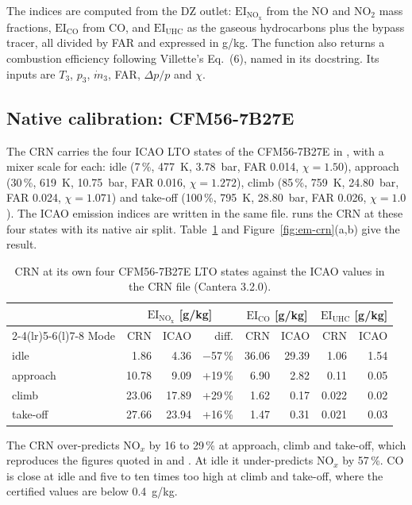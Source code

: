 \documentclass[a4paper,11pt]{article}
\newcommand{\EI}[1]{\mathrm{EI}_{\mathrm{#1}}}
\begin{document}
The indices are computed from the DZ outlet: $\EI{NO_x}$ from the NO and NO$_2$ mass fractions,
$\EI{CO}$ from CO, and $\EI{UHC}$ as the gaseous hydrocarbons plus the bypass tracer, all
divided by FAR and expressed in g/kg. The function also returns a combustion efficiency
following Villette's Eq.~(6), named in its docstring. Its inputs are $T_3$, $p_3$, $\dot m_3$,
FAR, $\Delta p/p$ and $\chi$.

\subsection{Native calibration: CFM56-7B27E}\label{sec:crn-native}
The CRN carries the four ICAO LTO states of the CFM56-7B27E in , with a mixer
scale for each: idle (7\,\%, \SI{477}{K}, \SI{3.78}{bar}, FAR 0.014, $\chi = 1.50$), approach
(30\,\%, \SI{619}{K}, \SI{10.75}{bar}, FAR 0.016, $\chi = 1.272$), climb (85\,\%, \SI{759}{K},
\SI{24.80}{bar}, FAR 0.024, $\chi = 1.071$) and take-off (100\,\%, \SI{795}{K},
\SI{28.80}{bar}, FAR 0.026, $\chi = 1.0$). The ICAO emission indices are written in the same
file.  runs the CRN at these four states with its native air split.
Table~\ref{tab:crn-native} and Figure~\ref{fig:em-crn}(a,b) give the result.

\begin{table}[htbp]
\centering\small
\caption{CRN at its own four CFM56-7B27E LTO states against the ICAO values in the CRN file
(Cantera 3.2.0).}\label{tab:crn-native}
\begin{tabular}{@{}lrrrrrrr@{}}
\toprule
 & \multicolumn{3}{c}{$\EI{NO_x}$ [g/kg]} & \multicolumn{2}{c}{$\EI{CO}$ [g/kg]} & \multicolumn{2}{c}{$\EI{UHC}$ [g/kg]} \\
\cmidrule(lr){2-4}\cmidrule(lr){5-6}\cmidrule(l){7-8}
Mode & CRN & ICAO & diff. & CRN & ICAO & CRN & ICAO \\
\midrule
idle & 1.86 & 4.36 & $-$57\,\% & 36.06 & 29.39 & 1.06 & 1.54 \\
approach & 10.78 & 9.09 & +19\,\% & 6.90 & 2.82 & 0.11 & 0.05 \\
climb & 23.06 & 17.89 & +29\,\% & 1.62 & 0.17 & 0.022 & 0.02 \\
take-off & 27.66 & 23.94 & +16\,\% & 1.47 & 0.31 & 0.021 & 0.03 \\
\bottomrule
\end{tabular}
\end{table}

The CRN over-predicts NO$_x$ by 16 to 29\,\% at approach, climb and take-off, which reproduces
the figures quoted in  and .
At idle it under-predicts NO$_x$ by 57\,\%. CO is close at idle and five to ten times too high at
climb and take-off, where the certified values are below \SI{0.4}{g/kg}.
\end{document}
